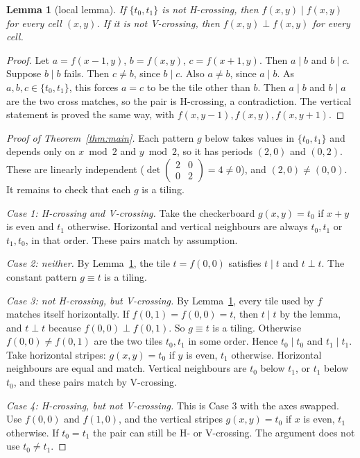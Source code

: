 \documentclass[11pt]{article}
\newtheorem{lemma}[theorem]{Lemma}
\theoremstyle{definition}
\theoremstyle{remark}
\begin{document}
\begin{lemma}[local lemma]\label{lem:loop}
If $\{t_0,t_1\}$ is not H-crossing, then $f(x,y)\mathrel{|}f(x,y)$ for every
cell $(x,y)$. If it is not V-crossing, then $f(x,y)\mathrel{\bot}f(x,y)$ for
every cell.
\end{lemma}
\begin{proof}
Let $a=f(x-1,y)$, $b=f(x,y)$, $c=f(x+1,y)$. Then $a\mathrel{|}b$ and $b\mathrel{|}c$.
Suppose $b\mathrel{|}b$ fails. Then $c\ne b$, since $b\mathrel{|}c$. Also $a\neq b$,
since $a\mathrel{|}b$. As $a,b,c\in\{t_0,t_1\}$, this forces $a=c$ to be the
tile other than $b$. Then $a\mathrel{|}b$ and $b\mathrel{|}a$ are the two cross
matches, so the pair is H-crossing, a contradiction. The vertical statement is
proved the same way, with $f(x,y-1),f(x,y),f(x,y+1)$.
\end{proof}

\begin{proof}[Proof of Theorem~\ref{thm:main}]
Each pattern $g$ below takes values in $\{t_0,t_1\}$ and depends only on
$x\bmod 2$ and $y\bmod 2$, so it has periods $(2,0)$ and $(0,2)$. These are
linearly independent ($\det\begin{pmatrix}2&0\\0&2\end{pmatrix}=4\neq0$), and
$(2,0)\ne(0,0)$. It remains to check that each $g$ is a tiling.

\emph{Case 1: H-crossing and V-crossing.} Take the checkerboard
$g(x,y)=t_0$ if $x+y$ is even and $t_1$ otherwise. Horizontal and vertical
neighbours are always $t_0,t_1$ or $t_1,t_0$, in that order. These pairs match by
assumption.

\emph{Case 2: neither.} By Lemma~\ref{lem:loop}, the tile $t=f(0,0)$ satisfies
$t\mathrel{|}t$ and $t\mathrel{\bot}t$. The constant pattern $g\equiv t$ is a tiling.

\emph{Case 3: not H-crossing, but V-crossing.} By Lemma~\ref{lem:loop}, every
tile used by $f$ matches itself horizontally. If $f(0,1)=f(0,0)=t$, then
$t\mathrel{|}t$ by the lemma, and $t\mathrel{\bot}t$ because
$f(0,0)\mathrel{\bot}f(0,1)$. So $g\equiv t$ is a tiling. Otherwise
$f(0,0)\neq f(0,1)$ are the two tiles $t_0,t_1$ in some order. Hence
$t_0\mathrel{|}t_0$ and $t_1\mathrel{|}t_1$. Take horizontal stripes:
$g(x,y)=t_0$ if $y$ is even, $t_1$ otherwise. Horizontal neighbours are equal
and match. Vertical neighbours are $t_0$ below $t_1$, or $t_1$ below $t_0$, and
these pairs match by V-crossing.

\emph{Case 4: H-crossing, but not V-crossing.} This is Case 3 with the axes
swapped. Use $f(0,0)$ and $f(1,0)$, and the vertical stripes $g(x,y)=t_0$ if $x$ is even,
$t_1$ otherwise. If $t_0=t_1$ the pair can still be H- or V-crossing. The
argument does not use $t_0\ne t_1$.
\end{proof}
\end{document}
